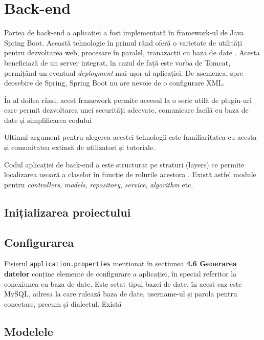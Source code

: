 \chapter{Back-end}

Partea de back-end a aplicației \thesistitle{} a fost implementată în framework-ul de Java Spring Boot. Această tehnologie în primul rând oferă o varietate de utilități pentru dezvoltarea web, procesare în paralel, tranazacții cu baza de date \cite{spring-boot-pros-cons}. Acesta beneficiază de un server integrat, în cazul de față este vorba de Tomcat, permițând un eventual \textit{deployment} mai ușor al aplicației. De asemenea, spre deosebire de Spring, Spring Boot nu are nevoie de o configurare XML.

În al doilea rând, acest framework permite accesul la o serie utilă de plugin-uri care permit dezvoltarea unei securități adecvate, comunicare facilă cu baza de date și simplificarea codului

Ultimul argument pentru alegerea acestei tehnologii este familiaritatea cu acesta și comunitatea extinsă de utilizatori și tutoriale.

Codul aplicației de back-end a \thesistitle{} este structurat pe straturi (layers) ce permite localizarea ușoară a claselor în funcție de rolurile acestora \cite{spring-boot-code-structure}. Există astfel module pentru \textit{controllers}, \textit{models}, \textit{repository}, \textit{service}, \textit{algorithm} etc.

\section{Inițializarea proiectului}



\section{Configurarea}

Fișierul \texttt{application.properties} menționat în secțiunea \textbf{4.6 Generarea datelor} conține elemente de configurare a aplicației, în special referitor la conexiunea cu baza de date. Este setat tipul bazei de date, în acest caz este MySQL, adresa la care rulează baza de date, username-ul și parola pentru conectare, precum și dialectul. Există 

\section{Modelele}

